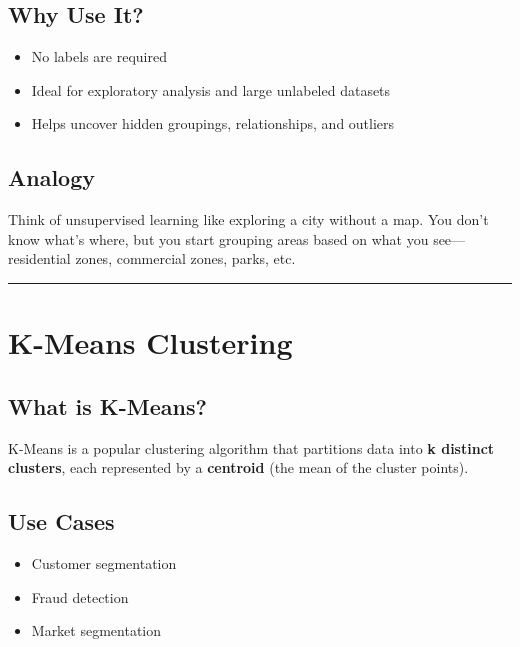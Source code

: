\documentclass[
  letterpaper,
  DIV=11,
  numbers=noendperiod]{scrreprt}
\providecommand{\tightlist}{%
  \setlength{\itemsep}{0pt}\setlength{\parskip}{0pt}}\usepackage{longtable,booktabs,array}
\begin{document}
\subsection{Why Use It?}\label{why-use-it}

\begin{itemize}
\tightlist
\item
  No labels are required
\item
  Ideal for exploratory analysis and large unlabeled datasets
\item
  Helps uncover hidden groupings, relationships, and outliers
\end{itemize}

\subsection{Analogy}\label{analogy}

Think of unsupervised learning like exploring a city without a map. You
don't know what's where, but you start grouping areas based on what you
see---residential zones, commercial zones, parks, etc.

\begin{center}\rule{0.5\linewidth}{0.5pt}\end{center}

\section{K-Means Clustering}\label{k-means-clustering}

\subsection{What is K-Means?}\label{what-is-k-means}

K-Means is a popular clustering algorithm that partitions data into
\textbf{k distinct clusters}, each represented by a \textbf{centroid}
(the mean of the cluster points).

\subsection{Use Cases}\label{use-cases}

\begin{itemize}
\tightlist
\item
  Customer segmentation
\item
  Fraud detection
\item
  Market segmentation
\end{itemize}
\end{document}
